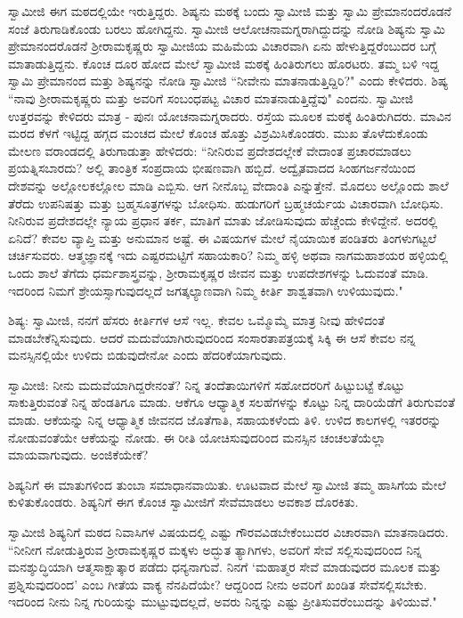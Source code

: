 ಸ್ವಾಮೀಜಿ ಈಗ ಮಠದಲ್ಲಿಯೇ ಇರುತ್ತಿದ್ದರು. ಶಿಷ್ಯನು ಮಠಕ್ಕೆ ಬಂದು ಸ್ವಾಮೀಜಿ ಮತ್ತು ಸ್ವಾಮಿ ಪ್ರೇಮಾನಂದರೊಡನೆ ಸಂಜೆ ತಿರುಗಾಡಿಕೊಂಡು ಬರಲು ಹೋಗಿದ್ದನು. ಸ್ವಾಮೀಜಿ ಆಲೋಚನಾಮಗ್ನರಾಗಿದ್ದುದನ್ನು ನೋಡಿ ಶಿಷ್ಯನು ಸ್ವಾಮಿ ಪ್ರೇಮಾನಂದರೊಡನೆ ಶ‍್ರೀರಾಮಕೃಷ್ಣರು ಸ್ವಾಮೀಜಿಯ ಮಹಿಮೆಯ ವಿಚಾರವಾಗಿ ಏನು ಹೇಳುತ್ತಿದ್ದರೆಂಬುದರ ಬಗ್ಗೆ ಮಾತಾಡುತ್ತಿದ್ದನು. ಕೊಂಚ ದೂರ ಹೋದ ಮೇಲೆ ಸ್ವಾಮೀಜಿ ಮಠಕ್ಕೆ ಹಿಂತಿರುಗಲು ಹೊರಟರು. ತಮ್ಮ ಬಳಿ ಇದ್ದ ಸ್ವಾಮಿ ಪ್ರೇಮಾನಂದ ಮತ್ತು ಶಿಷ್ಯನನ್ನು ನೋಡಿ ಸ್ವಾಮೀಜಿ “ನೀವೇನು ಮಾತನಾಡುತ್ತಿದ್ದಿರಿ?" ಎಂದು ಕೇಳಿದರು. ಶಿಷ್ಯ “ನಾವು ಶ‍್ರೀರಾಮಕೃಷ್ಣರು ಮತ್ತು ಅವರಿಗೆ ಸಂಬಂಧಪಟ್ಟ ವಿಚಾರ ಮಾತನಾಡುತ್ತಿದ್ದೆವು" ಎಂದನು. ಸ್ವಾಮೀಜಿ ಉತ್ತರವನ್ನು ಕೇಳಿದರು ಮಾತ್ರ - ಪುನಃ ಯೋಚನಾಮಗ್ನರಾದರು. ರಸ್ತೆಯ ಮೂಲಕ ಮಠಕ್ಕೆ ಹಿಂತಿರುಗಿದರು. ಮಾವಿನ ಮರದ ಕೆಳಗೆ ಇಟ್ಟಿದ್ದ ಹಗ್ಗದ ಮಂಚದ ಮೇಲೆ ಕೊಂಚ ಹೊತ್ತು ವಿಶ್ರಮಿಸಿಕೊಂಡರು. ಮುಖ ತೊಳೆದುಕೊಂಡು ಮೇಲಣ ವರಾಂಡದಲ್ಲಿ ತಿರುಗಾಡುತ್ತಾ ಹೇಳಿದರು: “ನೀನಿರುವ ಪ್ರದೇಶದಲ್ಲೇಕೆ ವೇದಾಂತ ಪ್ರಚಾರಮಾಡಲು ಪ್ರಯತ್ನಿಸಬಾರದು? ಅಲ್ಲಿ ತಾಂತ್ರಿಕ ಸಂಪ್ರದಾಯ ಭೀಷಣವಾಗಿ ಹಬ್ಬಿದೆ. ಅದ್ವೈತವಾದದ ಸಿಂಹಗರ್ಜನೆಯಿಂದ ದೇಶವನ್ನು ಅಲ್ಲೋಲಕಲ್ಲೋಲ ಮಾಡಿ ಎಬ್ಬಿಸು. ಆಗ ನೀನೊಬ್ಬ ವೇದಾಂತಿ ಎನ್ನುತ್ತೇನೆ. ಮೊದಲು ಅಲ್ಲೊಂದು ಶಾಲೆ ತೆರೆದು ಉಪನಿಷತ್ತು ಮತ್ತು ಬ್ರಹ್ಮಸೂತ್ರಗಳನ್ನು ಬೋಧಿಸು. ಹುಡುಗರಿಗೆ ಬ್ರಹ್ಮಚರ್ಯೆಯ ವಿಚಾರವಾಗಿ ಬೋಧಿಸು. ನೀನಿರುವ ಪ್ರದೇಶದಲ್ಲೇ ನ್ಯಾಯ ಪ್ರಧಾನ ತರ್ಕ, ಮಾತಿಗೆ ಮಾತು ಜೋಡಿಸುವುದು ಹೆಚ್ಚೆಂದು ಕೇಳಿದ್ದೇನೆ. ಅದರಲ್ಲಿ ಏನಿದೆ? ಕೇವಲ ವ್ಯಾಪ್ತಿ ಮತ್ತು ಅನುಮಾನ ಅಷ್ಟೆ. ಈ ವಿಷಯಗಳ ಮೇಲೆ ನೈಯಾಯಿಕ ಪಂಡಿತರು ತಿಂಗಳುಗಟ್ಟಲೆ ಚರ್ಚಿಸುವರು. ಆತ್ಮಜ್ಞಾನಕ್ಕೆ ಇದು ಎಷ್ಟರಮಟ್ಟಿಗೆ ಸಹಾಯಕಾರಿ? ನಿಮ್ಮ ಹಳ್ಳಿ ಅಥವಾ ನಾಗಮಹಾಶಯರ ಹಳ್ಳಿಯಲ್ಲಿ ಒಂದು ಶಾಲೆ ತೆಗೆದು ಧರ್ಮಶಾಸ್ತ್ರವನ್ನು, ಶ‍್ರೀರಾಮಕೃಷ್ಣರ ಜೀವನ ಮತ್ತು ಉಪದೇಶಗಳನ್ನು ಓದುವಂತೆ ಮಾಡಿ. ಇದರಿಂದ ನಿಮಗೆ ಶ್ರೇಯಸ್ಸಾಗುವುದಲ್ಲದೆ ಜಗತ್ಕಲ್ಯಾಣವಾಗಿ ನಿಮ್ಮ ಕೀರ್ತಿ ಶಾಶ್ವತವಾಗಿ ಉಳಿಯುವುದು."

ಶಿಷ್ಯ: ಸ್ವಾಮೀಜಿ, ನನಗೆ ಹೆಸರು ಕೀರ್ತಿಗಳ ಆಸೆ ಇಲ್ಲ. ಕೇವಲ ಒಮ್ಮೊಮ್ಮೆ ಮಾತ್ರ ನೀವು ಹೇಳಿದಂತೆ ಮಾಡಬೇಕೆನ್ನಿಸುವುದು. ಆದರೆ ಮದುವೆಯಾಗಿರುವುದರಿಂದ ಸಂಸಾರತಾಪತ್ರಯಕ್ಕೆ ಸಿಕ್ಕಿ ಈ ಆಸೆ ಕೇವಲ ನನ್ನ ಮನಸ್ಸಿನಲ್ಲಿಯೇ ಉಳಿದು ಬಿಡುವುದೇನೋ ಎಂದು ಹೆದರಿಕೆಯಾಗುವುದು.

ಸ್ವಾಮೀಜಿ: ನೀನು ಮದುವೆಯಾಗಿದ್ದರೇನಂತೆ? ನಿನ್ನ ತಂದೆತಾಯಿಗಳಿಗೆ ಸಹೋದರರಿಗೆ ಹಿಟ್ಟುಬಟ್ಟೆ ಕೊಟ್ಟು ಸಾಕುತ್ತಿರುವಂತೆ ನಿನ್ನ ಹೆಂಡತಿಗೂ ಮಾಡು. ಆಕೆಗೂ ಆಧ್ಯಾತ್ಮಿಕ ಸಲಹೆಗಳನ್ನು ಕೊಟ್ಟು ನಿನ್ನ ದಾರಿಯೆಡೆಗೆ ತಿರುಗುವಂತೆ ಮಾಡು. ಆಕೆಯನ್ನು ನಿನ್ನ ಆಧ್ಯಾತ್ಮಿಕ ಜೀವನದ ಜೊತೆಗಾತಿ, ಸಹಾಯಕಳೆಂದು ತಿಳಿ. ಉಳಿದ ಕಾಲಗಳಲ್ಲಿ ಇತರರನ್ನು ನೋಡುವಂತೆಯೇ ಆಕೆಯನ್ನು ನೋಡು. ಈ ರೀತಿ ಯೋಚಿಸುವುದರಿಂದ ಮನಸ್ಸಿನ ಚಂಚಲತೆಯೆಲ್ಲಾ ಮಾಯವಾಗುವುದು. ಅಂಜಿಕೆಯೇಕೆ?

ಶಿಷ್ಯನಿಗೆ ಈ ಮಾತುಗಳಿಂದ ತುಂಬಾ ಸಮಾಧಾನವಾಯಿತು. ಊಟವಾದ ಮೇಲೆ ಸ್ವಾಮೀಜಿ ತಮ್ಮ ಹಾಸಿಗೆಯ ಮೇಲೆ ಕುಳಿತುಕೊಂಡರು. ಶಿಷ್ಯನಿಗೆ ಈಗ ಕೊಂಚ ಸ್ವಾಮೀಜಿಗೆ ಸೇವೆಮಾಡಲು ಅವಕಾಶ ದೊರಕಿತು.

ಸ್ವಾಮೀಜಿ ಶಿಷ್ಯನಿಗೆ ಮಠದ ನಿವಾಸಿಗಳ ವಿಷಯದಲ್ಲಿ ಎಷ್ಟು ಗೌರವವಿಡಬೇಕೆಂಬುದರ ವಿಚಾರವಾಗಿ ಮಾತನಾಡಿದರು. “ನೀನೀಗ ನೋಡುತ್ತಿರುವ ಶ‍್ರೀರಾಮಕೃಷ್ಣರ ಮಕ್ಕಳು ಅದ್ಭುತ ತ್ಯಾಗಿಗಳು, ಅವರಿಗೆ ಸೇವೆ ಸಲ್ಲಿಸುವುದರಿಂದ ನಿನ್ನ ಮನಶ್ಶುದ್ಧಿಯಾಗಿ ಆತ್ಮಸಾಕ್ಷಾತ್ಕಾರ ಪಡೆದು ಧನ್ಯನಾಗುವೆ. ನಿನಗೆ ‘ಮಹಾತ್ಮರ ಸೇವೆ ಮಾಡುವುದರ ಮೂಲಕ ಮತ್ತು ಪ್ರಶ್ನಿಸುವುದರಿಂದ’ ಎಂಬ ಗೀತೆಯ ವಾಕ್ಯ ನೆನಪಿದೆಯೇ? ಆದ್ದರಿಂದ ನೀನು ಅವರಿಗೆ ಖಂಡಿತ ಸೇವೆಸಲ್ಲಿಸಬೇಕು. ಇದರಿಂದ ನೀನು ನಿನ್ನ ಗುರಿಯನ್ನು ಮುಟ್ಟುವುದಲ್ಲದೆ, ಅವರು ನಿನ್ನನ್ನು ಎಷ್ಟು ಪ್ರೀತಿಸುವರೆಂಬುದನ್ನು ತಿಳಿಯುವೆ."

